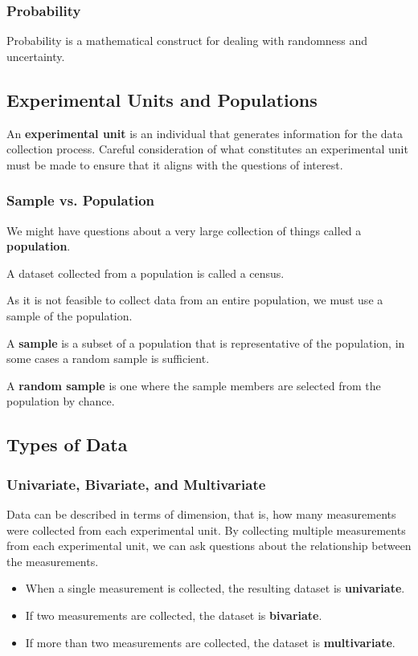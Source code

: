 \documentclass{article}
\begin{document}
\subsubsection{Probability}
Probability is a mathematical construct for dealing with randomness and uncertainty.
\subsection{Experimental Units and Populations}
\begin{definition}
    An \textbf{experimental unit} is an individual that generates information for the data collection process.
    Careful consideration of what constitutes an \linebreak experimental unit must be made to ensure that it aligns with the questions of interest.
\end{definition}
\subsubsection{Sample vs. Population}
\begin{definition}[Population]
    We might have questions about a very large collection of things called a \textbf{population}.

    A dataset collected from a population is called a census.
\end{definition}
As it is not feasible to collect data from an entire population,
we must use a sample of the population.
\begin{definition}[Sample]
    A \textbf{sample} is a subset of a population that is representative of the population, in some cases a random sample is sufficient.
\end{definition}
\begin{definition}
    A \textbf{random sample} is one where the sample members are selected from the population by chance.
\end{definition}
\subsection{Types of Data}
\subsubsection{Univariate, Bivariate, and Multivariate}
Data can be described in terms of dimension, that is, how many measurements were collected from each experimental unit.
By collecting multiple measurements from each experimental unit, we can ask questions about the relationship between the measurements.
\begin{itemize}
    \item When a single measurement is collected, the resulting dataset is \textbf{univariate}.
    \item If two measurements are collected, the dataset is \textbf{bivariate}.
    \item If more than two measurements are collected, the dataset is \textbf{multivariate}.
\end{itemize}
\end{document}
